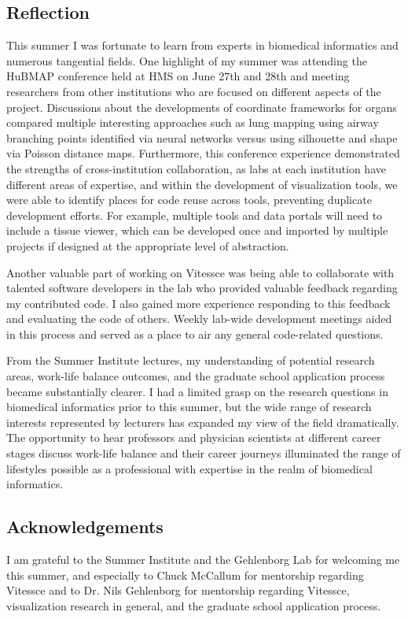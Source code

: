 \documentclass[12pt, letterpaper]{article}
\begin{document}
\subsection{Reflection}
This summer I was fortunate to learn from experts in biomedical informatics and numerous tangential fields.
One highlight of my summer was attending the HuBMAP conference held at HMS on June 27th and 28th and meeting researchers from other institutions who are focused on different aspects of the project.
Discussions about the developments of coordinate frameworks for organs compared multiple interesting approaches such as lung mapping using airway branching points identified via neural networks versus using silhouette and shape via Poisson distance maps.
Furthermore, this conference experience demonstrated the strengths of cross-institution collaboration, as labs at each institution have different areas of expertise, and within the development of visualization tools, we were able to identify places for code reuse across tools, preventing duplicate development efforts.
For example, multiple tools and data portals will need to include a tissue viewer, which can be developed once and imported by multiple projects if designed at the appropriate level of abstraction.

Another valuable part of working on Vitessce was being able to collaborate with talented software developers in the lab who provided valuable feedback regarding my contributed code.
I also gained more experience responding to this feedback and evaluating the code of others.
Weekly lab-wide development meetings aided in this process and served as a place to air any general code-related questions.

From the Summer Institute lectures, my understanding of potential research areas, work-life balance outcomes, and the graduate school application process became substantially clearer.
I had a limited grasp on the research questions in biomedical informatics prior to this summer, but the wide range of research interests represented by lecturers has expanded my view of the field dramatically.
The opportunity to hear professors and physician scientists at different career stages discuss work-life balance and their career journeys illuminated the range of lifestyles possible as a professional with expertise in the realm of biomedical informatics.


\subsection*{Acknowledgements}
I am grateful to the Summer Institute and the Gehlenborg Lab for welcoming me this summer, and especially to Chuck McCallum for mentorship regarding Vitessce and to Dr. Nils Gehlenborg for mentorship regarding Vitessce, visualization research in general, and the graduate school application process.


{}

\end{document}
